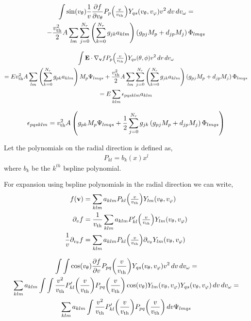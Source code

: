 \documentclass{article}[draft]
\begin{document}
\begin{multline*}
\myint \sin\of{\vtheta} \frac{1}{\vr} \frac{\partial f}{\partial \vtheta} P_p\of{\textstyle\frac{\vr}{\vth}} Y_{qs}\of{\vtheta,\vphi} \vr^2 \diff{\vr} \diff{\vomega}
=
\\
-
\frac{\vth^2}{2}
A \sum_{lm} \sum_{j=0}^{N_r} \left(\sum_{k=0}^{N_r} g_{jk} a_{klm} \right) 
\left(
g_{pj} M_p
+
d_{jp} M_j
\right)
\Phi_{lmqs}
\end{multline*}

\begin{multline*}
\myint \vect{E}\cdot \nabla_{\vect{v}} f P_p\of{\textstyle\frac{\vr}{\vth}} Y_{qs}\of{\theta,\phi} \vr^2 \diff{\vr} \diff{\vomega}
\\
=
E
\vth^2
A \sum_{lm} \left(\sum_{k=0}^{N_r} g_{pk} a_{klm} \right) 
M_{p}
\Psi_{lmqs}
+
\frac{\vth^2}{2}
A \sum_{lm} \sum_{j=0}^{N_r} \left(\sum_{k=0}^{N_r} g_{jk} a_{klm} \right) 
\left(
g_{pj} M_p
+
d_{jp} M_j
\right)
\Phi_{lmqs}
\\
=
E
\sum_{klm}
\epsilon_{pqsklm} a_{klm}
\end{multline*}

\begin{align*}
\epsilon_{pqsklm} =
v_\textrm{th}^2 A 
\left(
g_{pk} M_{p} \Psi_{lmqs}
+
\frac{1}{2}
\sum_{j=0}^{N_r} g_{jk} 
\left(
g_{pj} M_p
+
d_{jp} M_j
\right)
\Phi_{lmqs}
\right)
\end{align*}


Let the polynomials on the radial direction is defined as, 
\begin{align}
	P_{kl} = b_k(x) x^l
\end{align} where $b_k$ be the $k^{th}$ bspline polynomial. 

For expansion using bspline polynomials in the radial direction we can write, 
\begin{align}
f(\vect{v}) &= \sum_{klm} a_{klm} P_{kl}\of{\textstyle\frac{v}{\vth}} Y_{lm}\of{\vtheta,\vphi}\\
\partial_v f &= \frac{1}{\vth} \sum_{klm} a_{klm} P^\prime_{kl}\of{\textstyle\frac{v}{\vth}} Y_{lm}\of{\vtheta,\vphi}\\
\frac{1}{v}\partial_{v_\theta} f &= \sum_{klm} a_{klm} P_{kl}\of{\textstyle\frac{v}{\vth}} \partial_{v_\theta} Y_{lm}\of{\vtheta,\vphi}
\end{align}

\begin{multline}
\myint \myint \cos\of{\vtheta} \frac{\partial f}{\partial \vr} P_{pq}\of{\frac{\vr}{\vth}} Y_{qs}\of{\vtheta,\vphi} \vr^2 \diff{\vr} \diff{\vomega}= \\
\sum_{klm} a_{klm} \myint \myint \frac{v^2}{\vth}  P^\prime_{kl}\of{\frac{\vr}{\vth}} P_{pq}\of{\frac{\vr}{\vth}} \cos\of{\vtheta} Y_{lm}\of{\vtheta,\vphi} Y_{qs}\of{\vtheta,\vphi} \diff{v}\diff{v_\omega} =\\
\sum_{klm} a_{klm} \myint \frac{v^2}{\vth}  P^\prime_{kl}\of{\frac{\vr}{\vth}} P_{pq}\of{\frac{\vr}{\vth}} \diff{v} \Psi_{lmqs}
\end{multline}
\end{document}
